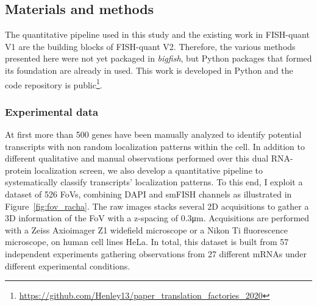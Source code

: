 

\subsection{Materials and methods}
\label{subsec:materials_general_pattern}

The quantitative pipeline used in this study and the existing work in FISH-quant V1 are the building blocks of FISH-quant V2.
Therefore, the various methods presented here were not yet packaged in \emph{bigfish}, but Python packages that formed its foundation are already in used.
This work is developed in Python and the code repository is public\footnote{\url{https://github.com/Henley13/paper_translation_factories_2020}}.

\subsubsection{Experimental data}

At first more than 500 genes have been manually analyzed to identify potential transcripts with non random localization patterns within the cell.
In addition to different qualitative and manual observations performed over this dual \ac{RNA}-protein localization screen, we also develop a quantitative pipeline to systematically classify transcripts' localization patterns.
To this end, I exploit a dataset of 526 \ac{FoV}s, combining DAPI and \ac{smFISH} channels as illustrated in Figure~\ref{fig:fov_racha}.
The raw images stacks several 2D acquisitions to gather a 3D information of the \ac{FoV} with a z-spacing of 0.3μm.
Acquisitions are performed with a Zeiss Axioimager Z1 widefield microscope or a Nikon Ti fluorescence microscope, on human cell lines HeLa.
In total, this dataset is built from 57 independent experiments gathering observations from 27 different \ac{mRNA}s under different experimental conditions.

